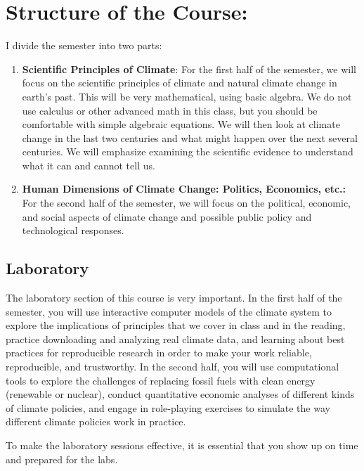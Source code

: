 \documentclass[11pt,twoside]{jgsyllabus}\usepackage[]{graphicx}\usepackage[]{color}
\begin{document}
\section[Structure]{Structure of the Course:}
I divide the semester into two parts:
\begin{enumerate}
    \item \textbf{Scientific Principles of Climate}: For the first half of the semester,
    we will focus on the scientific principles of climate and natural climate change in earth's
    past. This will be very mathematical, using basic algebra. We do not use calculus or
    other advanced math in this class, but you should be comfortable with simple algebraic
    equations.
    We will then
    look at climate change in the last two centuries and what might
    happen over the next several centuries. We will emphasize examining the
    scientific evidence to understand what it can and cannot tell us.
    \item \textbf{Human Dimensions of Climate Change: Politics, Economics, etc.:}
    For the second half of the semester, we will focus on the political, economic, and social aspects
    of climate change and possible public policy and technological responses.
\end{enumerate}
%
%
%
\subsection{Laboratory}
The laboratory section of this course is very important.
In the first half of the semester, you will use interactive computer models of the climate system to explore the implications of principles that we cover in class and in the reading,
practice downloading and analyzing real climate data, and
learning about best practices for reproducible research in order to make your work
reliable, reproducible, and trustworthy.
In the second half, you will use computational tools to explore the challenges of replacing fossil fuels with clean energy (renewable or nuclear), conduct quantitative economic analyses of different kinds of climate policies, and engage in role-playing exercises to simulate the way different climate policies work in practice.

To make the laboratory sessions effective, it is essential that you show up on time and prepared for the labs.
\end{document}

